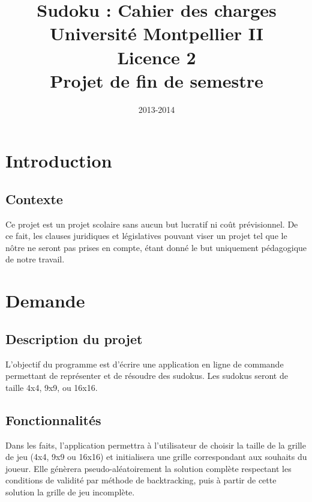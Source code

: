 \documentclass[a4paper, 12pt]{article}
\title{Sudoku : Cahier des charges\\\small{Université Montpellier II\\Licence 2\\Projet de fin de semestre}}
\date{2013-2014}
\begin{document}
\maketitle

\clearpage

\tableofcontents

\clearpage

\listoffigures

\clearpage

\section{Introduction}
\subsection{Contexte}

\par Ce projet est un projet scolaire sans aucun but lucratif ni coût prévisionnel. De ce fait, les clauses juridiques et législatives pouvant viser un projet tel que le nôtre ne seront pas prises en compte, étant donné le but uniquement pédagogique de notre travail.

\clearpage

\section{Demande}
\subsection{Description du projet}

\par L'objectif du programme est d'écrire une application en ligne de commande permettant de représenter et de résoudre des sudokus. Les sudokus seront de taille 4x4, 9x9, ou 16x16.

\subsection{Fonctionnalités}

\par Dans les faits, l'application permettra à l'utilisateur de choisir la taille de la grille de jeu (4x4, 9x9 ou 16x16) et initialisera une grille correspondant aux souhaits du joueur. Elle génèrera pseudo-aléatoirement la solution complète respectant les conditions de validité par méthode de backtracking, puis à partir de cette solution la grille de jeu incomplète.
\end{document}
